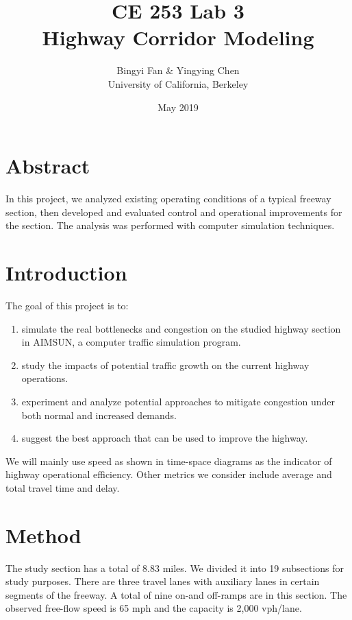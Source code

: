 \documentclass{article}
\begin{document}
\title{CE 253 Lab 3 \\ Highway Corridor Modeling}
\author{Bingyi Fan & Yingying Chen \\ \bigskip University of California, Berkeley}
\date{May 2019}

\maketitle
\newpage
\tableofcontents

\newpage
\section{Abstract}
In this project, we analyzed existing operating conditions of a typical freeway section, then developed and evaluated control and operational improvements for the section. The analysis was performed with computer simulation techniques.

\section{Introduction}
The goal of this project is to: \begin{enumerate}
    \item simulate the real bottlenecks and congestion on the studied highway section in AIMSUN, a computer traffic simulation program.
    \item study the impacts of potential traffic growth on the current highway operations.
    \item experiment and analyze potential approaches to mitigate congestion under both normal and increased demands.
    \item suggest the best approach that can be used to improve the highway.
\end{enumerate}

We will mainly use speed as shown in time-space diagrams as the indicator of highway operational efficiency. Other metrics we consider include average and total travel time and delay.

\section{Method}
The study section has a total of 8.83 miles. We divided it into 19 subsections for study purposes. There are three travel lanes with auxiliary lanes in certain segments of the freeway. A total of nine on-and off-ramps are in this section. The observed free-flow speed is 65 mph and the capacity is 2,000 vph/lane. 
\bigskip
\end{document}
